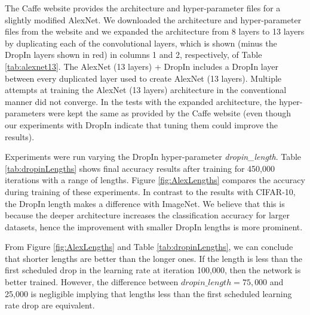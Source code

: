 \documentclass[10pt,twocolumn,letterpaper]{article}
\newcommand{\dropin}{DropIn }
\begin{document}
The Caffe website provides the architecture and hyper-parameter files for a slightly modified AlexNet. %
We downloaded the architecture and hyper-parameter files from the website and we expanded the architecture from 8 layers to 13 layers by duplicating each of the convolutional layers, which is shown (minus the \dropin layers shown in red) in columns 1 and 2, respectively, of Table \ref{tab:alexnet13}.
The AlexNet (13 layers) + \dropin includes a \dropin layer between every duplicated layer used to create AlexNet (13 layers).
Multiple attempts at training the AlexNet (13 layers) architecture in the conventional manner did not converge.
In the tests with the expanded architecture, the hyper-parameters were kept the same as provided by the Caffe website (even though our experiments with \dropin indicate that tuning them could improve the results).

Experiments were run varying the \dropin hyper-parameter \textit{dropin\_length}.
Table \ref{tab:dropinLengths} shows final accuracy results after training for 450,000 iterations with a range of lengths. 
Figure \ref{fig:AlexLengths} compares the accuracy during training of these experiments.
In contrast to the results with CIFAR-10, the \dropin length makes a difference with ImageNet.
We believe that this is because the deeper architecture increases the classification accuracy for larger datasets, hence  the improvement with smaller \dropin lengths is more prominent.

From Figure \ref{fig:AlexLengths} and Table \ref{tab:dropinLengths},  we can conclude that shorter lengths are better than the longer ones.
If the length is less than the first scheduled drop in the learning rate at iteration 100,000, then the network is better trained.
However, the difference between $dropin\_length = 75,000$ and 25,000 is negligible implying that lengths less than the first scheduled learning rate drop are equivalent.
\end{document}
